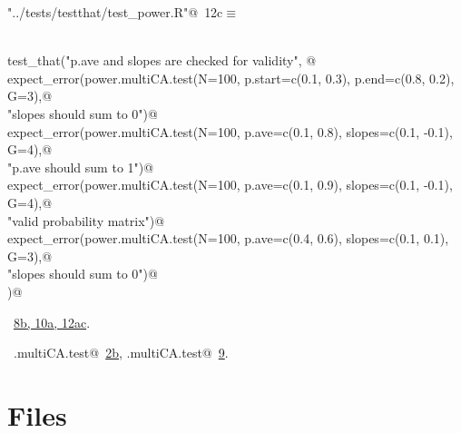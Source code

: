 \documentclass[reqno]{amsart}
\renewcommand{\NWtarget}[2]{\hypertarget{#1}{#2}}
\renewcommand{\NWlink}[2]{\hyperlink{#1}{#2}}
\begin{document}
\begin{flushleft} \small\label{scrap20}\raggedright\small
\NWtarget{nuweb12c}{} \verb@"../tests/testthat/test_power.R"@\nobreak\ {\footnotesize {12c}}$\equiv$
\vspace{-1ex}
\begin{list}{}{} \item
\mbox{}\verb@@\\
\mbox{}\verb@  test_that("p.ave and slopes are checked for validity", {@\\
\mbox{}\verb@    expect_error(power.multiCA.test(N=100, p.start=c(0.1, 0.3), p.end=c(0.8, 0.2), G=3),@\\
\mbox{}\verb@                "slopes should sum to 0")@\\
\mbox{}\verb@    expect_error(power.multiCA.test(N=100, p.ave=c(0.1, 0.8), slopes=c(0.1, -0.1), G=4),@\\
\mbox{}\verb@                  "p.ave should sum to 1")@\\
\mbox{}\verb@    expect_error(power.multiCA.test(N=100, p.ave=c(0.1, 0.9), slopes=c(0.1, -0.1), G=4),@\\
\mbox{}\verb@                  "valid probability matrix")@\\
\mbox{}\verb@    expect_error(power.multiCA.test(N=100, p.ave=c(0.4, 0.6), slopes=c(0.1, 0.1), G=3),@\\
\mbox{}\verb@                "slopes should sum to 0")@\\
\mbox{}\verb@  })@\\
\mbox{}\verb@@{\NWsep}
\end{list}
\vspace{-1.5ex}
\footnotesize
\begin{list}{}{\setlength{\itemsep}{-\parsep}\setlength{\itemindent}{-\leftmargin}}
\item \NWtxtFileDefBy\ \NWlink{nuweb8b}{8b}\NWlink{nuweb10a}{, 10a}\NWlink{nuweb12a}{, 12a}\NWlink{nuweb12c}{c}.
\item \NWtxtIdentsUsed\nobreak\  \verb@.multiCA.test@\nobreak\ \NWlink{nuweb2b}{2b}, \verb@power.multiCA.test@\nobreak\ \NWlink{nuweb9}{9}.
\item{}
\end{list}
\vspace{4ex}
\end{flushleft}
\section{Files}
\end{document}
